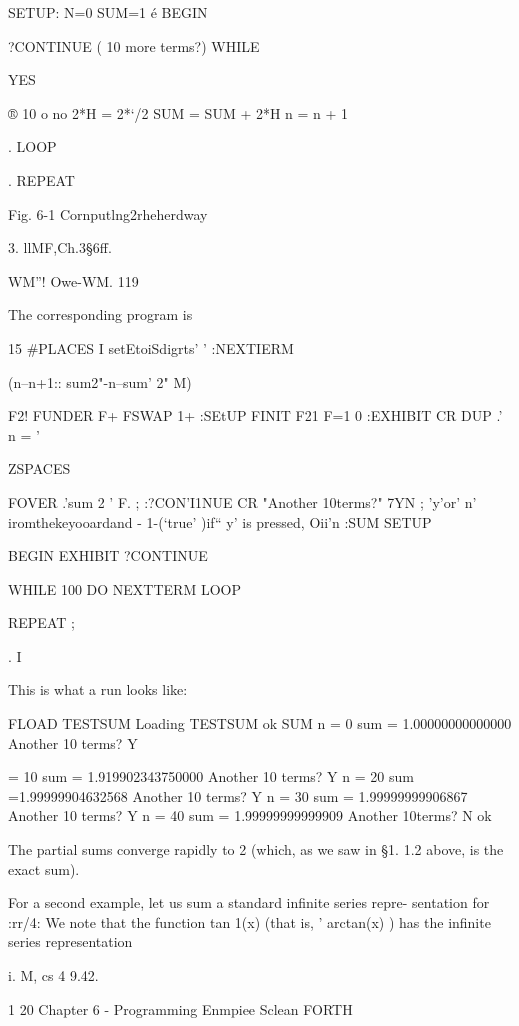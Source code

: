  

SETUP: N=0 SUM=1
é BEGIN

?CONTINUE ( 10 more terms?)
WHILE

    

YES

 

® 10 o no
2*H = 2*‘/2
SUM = SUM + 2*H
n = n + 1

. LOOP

. REPEAT

 

 

Fig. 6-1 Cornputlng2rheherdway

 

3. llMF,Ch.3§6ff.

WM”! Owe-WM. 119

The corresponding program is

15 #PLACES I setEtoiSdigrts' '
:NEXTIERM \

(n--n+1:: sum2"-n--sum' 2" M)

F2! FUNDER F+ FSWAP 1+
:SEtUP FINIT F21 F=1 0
:EXHIBIT CR DUP .' n = '

ZSPACES

FOVER .'sum 2 ' F. ;
:?CON'I1NUE CR "Another 10terms?" 7YN ;
\WNexpectsa'y'or' n' iromthekeyooardand
\leaves- 1-(‘true' )if“ y' is pressed, Oii'n
:SUM SETUP

BEGIN EXHIBIT ?CONTINUE

WHILE 100 DO NEXTTERM LOOP

REPEAT ;

.
I

This is what a run looks like:

FLOAD TESTSUM Loading TESTSUM ok
SUM
n = 0 sum = 1.00000000000000
Another 10 terms? Y

= 10 sum = 1.919902343750000
Another 10 terms? Y
n = 20 sum =1.99999904632568
Another 10 terms? Y
n = 30 sum = 1.99999999906867
Another 10 terms? Y
n = 40 sum = 1.99999999999909
Another 10terms? N ok

The partial sums converge rapidly to 2 (which, as we saw in §1. 1.2
above, is the exact sum).

For a second example, let us sum a standard inﬁnite series repre-
sentation for :rr/4: We note that the function tan 1(x) (that is,
' arctan(x) ) has the infinite series representation

 

i. M, cs 4 9.42.

1 20 Chapter 6 - Programming Enmpiee Sclean FORTH

